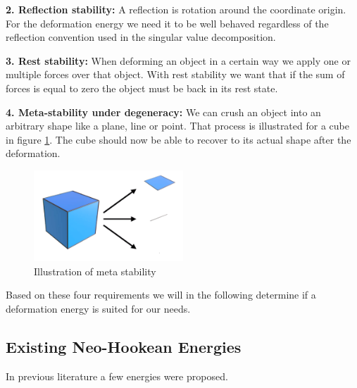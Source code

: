 \textbf{2. Reflection stability:} A reflection is rotation around the coordinate origin.
For the deformation energy we need it to be well behaved regardless of the reflection convention used in the singular value decomposition.

\textbf{3. Rest stability:} When deforming an object in a certain way we apply one or multiple forces over that object. With rest stability we want that if the sum of forces is equal to zero the object must be back in its rest state.

\textbf{4. Meta-stability under degeneracy:} We can crush an object into an arbitrary shape like a plane, line or point. That process is illustrated for a cube in figure \ref{fig:meta_stability}. The cube should now be able to recover to its actual shape after the deformation.

\begin{figure}[!htbp]
	\centering
	\includegraphics[width=0.5\textwidth]{resources/meta_stability}
	\caption{Illustration of meta stability {\cite{STREAM2018}}}
	\label{fig:meta_stability}
\end{figure}

Based on these four requirements we will in the following determine if a deformation energy is suited for our needs.


\subsection{Existing Neo-Hookean Energies}

In previous literature a few energies were proposed.

